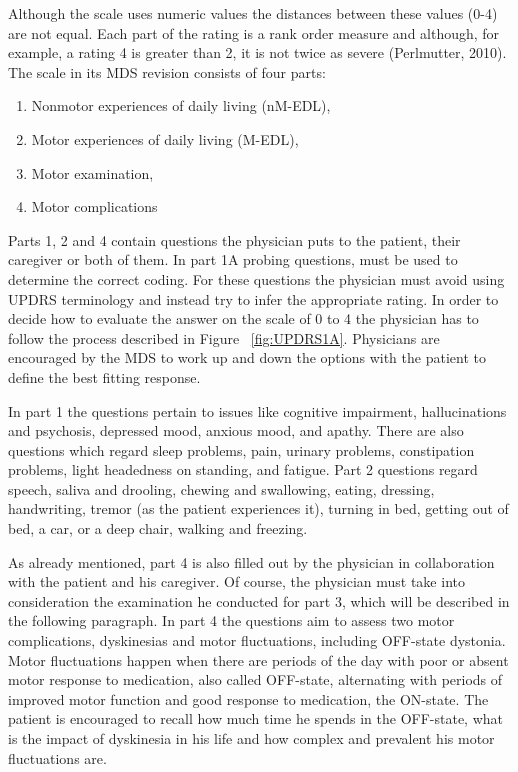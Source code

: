 Although the scale uses numeric values the distances between these values (0-4) are not equal. Each part of the rating is a rank order measure and although, for example, a rating 4 is greater than 2, it is not twice as severe (Perlmutter, 2010). The scale in its \gls{MDS} revision consists of four parts:
\begin{enumerate}
\item Nonmotor experiences of daily living (nM-EDL),
\item Motor experiences of daily living (M-EDL),
\item Motor examination,
\item Motor complications
\end{enumerate}

Parts 1, 2 and 4 contain questions the physician puts to the patient, their caregiver or both of them. In part 1A probing questions, must be used to determine the correct coding. For these questions the physician must avoid using \gls{UPDRS} terminology and instead try to infer the appropriate rating. In order to decide how to evaluate the answer on the scale of 0 to 4 the physician has to follow the process described in Figure ~\ref{fig:UPDRS1A}. Physicians are encouraged by the \gls{MDS} to work up and down the options with the patient to define the best fitting response.



In part 1 the questions pertain to issues like cognitive impairment, hallucinations and psychosis, depressed mood, anxious mood, and apathy. There are also questions which regard sleep problems, pain, urinary problems, constipation problems, light headedness on standing, and fatigue. Part 2 questions regard speech, saliva and drooling, chewing and swallowing, eating, dressing, handwriting, tremor (as the patient experiences it), turning in bed, getting out of bed, a car, or a deep chair, walking and freezing.

As already mentioned, part 4 is also filled out by the physician in collaboration with the patient and his caregiver. Of course, the physician must take into consideration the examination he conducted for part 3, which will be described in the following paragraph. In part 4 the questions aim to assess two motor complications, dyskinesias and motor fluctuations, including OFF-state dystonia. Motor fluctuations happen when there are periods of the day with poor or absent motor response to medication, also called OFF-state, alternating with periods of improved motor function and good response to medication, the ON-state. The patient is encouraged to recall how much time he spends in the OFF-state, what is the impact of dyskinesia in his life and how complex and prevalent his motor fluctuations are.

